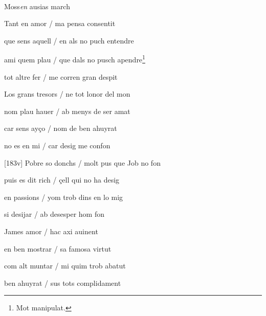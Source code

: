 \documentclass[12pt]{article}
\renewcommand{\espaiAbansEtiquetaPoema}{\vspace{0ex}}
\begin{document}
\begin{estrofa}

\espaiAbansEtiquetaPoema

\\

\begin{rubrica}

Moss\textit{en} ausias march

\end{rubrica}

\end{estrofa}


\begin{estrofa}

 Tant en amor / ma pensa consentit

 que sens aquell / en als no puch entendre

 ami quem plau / que dals no pusch apendre\footnote{Mot manipulat.}

 tot altre fer / me corren gran despit

 Los grans tresors / ne tot lonor del mon

 nom plau hauer / ab menys de ser amat

 car sens ay\c{c}o / nom de ben ahuyrat

 no es en mi / car desig me confon

\end{estrofa}



\begin{estrofa}

 [183v] Pobre so donchs / molt pus que Job no fon

 puis es dit rich / \c{c}ell qui no ha desig

 en passions / yom trob dins en lo mig

 si desijar / ab desesper hom fon

 James amor / hac axi auinent

 en ben mostrar / sa famosa virtut

 com alt muntar / mi quim trob abatut

 ben ahuyrat / sus tots complidament

\end{estrofa}
\end{document}
